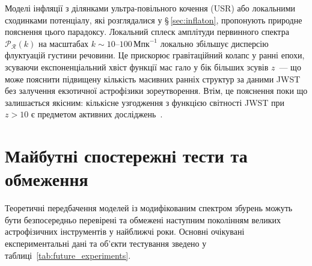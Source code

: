 Моделі інфляції з ділянками ультра-повільного кочення (USR) або локальними сходинками потенціалу, які розглядалися у §\,\ref{sec:inflaton}, пропонують природне пояснення цього парадоксу. Локальний сплеск амплітуди первинного спектра $\mathcal{P}_{\mathcal{R}}(k)$ на масштабах $k \sim 10\text{--}100\,\text{Мпк}^{-1}$ локально збільшує дисперсію флуктуацій густини речовини. Це прискорює гравітаційний колапс у ранні епохи, зсуваючи експоненціальний хвіст функції мас гало у бік більших зсувів $z$~--- що може пояснити підвищену кількість масивних ранніх структур за даними JWST без залучення екзотичної астрофізики зореутворення. Втім, це пояснення поки що залишається якісним: кількісне узгодження з функцією світності JWST при $z > 10$ є предметом активних досліджень~\cite{Boylan-Kolchin2023}.

\section{Майбутні спостережні тести та обмеження}
\label{sec:observations}

Теоретичні передбачення моделей із модифікованим спектром збурень можуть бути безпосередньо перевірені та обмежені наступним поколінням великих астрофізичних інструментів у найближчі роки. Основні очікувані експериментальні дані та об'єкти тестування зведено у таблиці~\ref{tab:future_experiments}.

